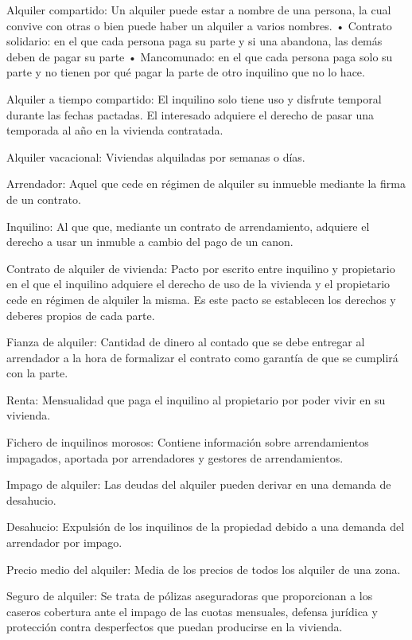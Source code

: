 Alquiler compartido:
Un alquiler puede estar a nombre de una persona, la cual convive con otras o bien puede haber un alquiler a varios nombres. 
    • Contrato solidario: en el que cada persona paga su parte y si una abandona, las demás deben de pagar su parte
    • Mancomunado: en el que cada persona paga solo su parte y no tienen por qué pagar la parte de otro inquilino que no lo hace.

Alquiler a tiempo compartido:
El inquilino solo tiene uso y disfrute temporal durante las fechas pactadas. El interesado adquiere el derecho de pasar una temporada al año en la vivienda contratada.

Alquiler vacacional:
Viviendas alquiladas por semanas o días. 

Arrendador:
Aquel que cede en régimen de alquiler su inmueble mediante la firma de un contrato. 

Inquilino:
Al que que, mediante un contrato de arrendamiento, adquiere el derecho a usar un inmuble a cambio del pago de un canon.

Contrato de alquiler de vivienda:
Pacto por escrito entre inquilino y propietario en el que el inquilino adquiere el derecho de uso de la vivienda y el propietario cede en régimen de alquiler la misma. Es este pacto se establecen los derechos y deberes propios de cada parte.

Fianza de alquiler: Cantidad de dinero al contado que se debe entregar al arrendador a la hora de formalizar el contrato como garantía de que se cumplirá con la parte.

Renta: 
Mensualidad que paga el inquilino al propietario por poder vivir en su vivienda.

Fichero de inquilinos morosos:
Contiene información sobre arrendamientos impagados, aportada por arrendadores y gestores de arrendamientos.

Impago de alquiler:
Las deudas del alquiler pueden derivar en una demanda de desahucio.

Desahucio:
Expulsión de los inquilinos de la propiedad debido a una demanda del arrendador por impago.

Precio medio del alquiler:
Media de los precios de todos los alquiler de una zona.

Seguro de alquiler:
Se trata de pólizas aseguradoras que proporcionan a los caseros cobertura ante el impago de las cuotas mensuales, defensa jurídica y protección contra desperfectos que puedan producirse en la vivienda.
